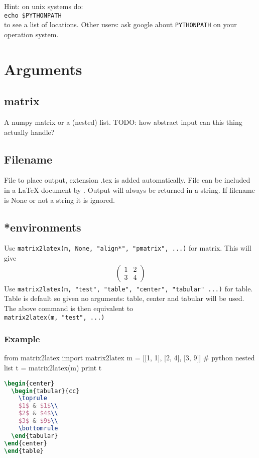 Hint: on unix systems do: \\
\verb!echo $PYTHONPATH! \\
to see a list of locations. Other users: ask google about \verb!PYTHONPATH!
on your operation system.

\section{Arguments}
  
\subsection{matrix}
  A numpy matrix or a (nested) list. TODO: how abstract input can this thing actually handle?

\subsection{Filename}
  File to place output, extension .tex is added automatically. File can be included in a LaTeX
  document by \verb!!. Output will always be returned in a string. If filename is None
  or not a string it is ignored.
  
\subsection{*environments}
  Use 
\lstinline{matrix2latex(m, None, "align*", "pmatrix", ...)} for matrix.
  This will give
  \begin{align*}
    \begin{pmatrix}
      1 & 2 \\
      3 & 4
    \end{pmatrix}
  \end{align*}
  Use 
\lstinline{matrix2latex(m, "test", "table", "center", "tabular" ...)} for table.
  Table is default so given no arguments: table, center and tabular will be used.
  The above command is then equivalent to \\
\lstinline{matrix2latex(m, "test", ...)}

\subsubsection{Example}
\begin{sageblock}
  from matrix2latex import matrix2latex
  m = [[1, 1], [2, 4], [3, 9]] # python nested list
  t = matrix2latex(m)
  print t
\end{sageblock}
\begin{lstlisting}[language=tex, morekeywords={begin}]
\begin{center}
  \begin{tabular}{cc}
    \toprule
    $1$ & $1$\\
    $2$ & $4$\\
    $3$ & $9$\\
    \bottomrule
  \end{tabular}
\end{center}
\end{table}
\end{lstlisting}

